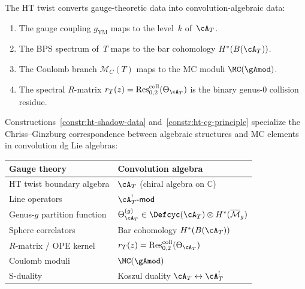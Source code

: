 \begin{construction}
\label{constr:ht-cg-principle}
The HT twist converts gauge-theoretic data into convolution-algebraic
data:
\begin{enumerate}[label=\textup{(\roman*)}]
\item The gauge coupling $g_{\mathrm{YM}}$ maps to the level~$k$
 of~$\cA_T$.
\item The BPS spectrum of~$T$ maps to the bar cohomology
 $H^*(B(\cA_T))$.
\item The Coulomb branch $\mathcal{M}_C(T)$ maps to the MC moduli
 $\MC(\gAmod)$.
\item The spectral $R$-matrix
 $r_T(z) = \operatorname{Res}^{\mathrm{coll}}_{0,2}(\Theta_{\cA_T})$
 is the binary genus-$0$ collision residue.
\end{enumerate}
\end{construction}

\begin{remark}[Dictionary]
\label{rem:ht-cg-dictionary}
Constructions~\ref{constr:ht-shadow-data} and~\ref{constr:ht-cg-principle} specialize the Chriss--Ginzburg
correspondence between algebraic structures and MC elements in
convolution dg Lie algebras:
\begin{center}
\renewcommand{\arraystretch}{1.2}
\begin{tabular}{ll}
\toprule
\textbf{Gauge theory} & \textbf{Convolution algebra} \\
\midrule
HT twist boundary algebra & $\cA_T$ (chiral algebra on $\mathbb{C}$) \\
Line operators & $\cA_T^!\text{-}\mathsf{mod}$ \\
Genus-$g$ partition function &
$\Theta_{\cA_T}^{(g)} \in \Defcyc(\cA_T) \otimes
H^*(\overline{\mathcal{M}}_g)$ \\
Sphere correlators & Bar cohomology $H^*(B(\cA_T))$ \\
$R$-matrix / OPE kernel &
$r_T(z) = \operatorname{Res}^{\mathrm{coll}}_{0,2}(\Theta_{\cA_T})$ \\
Coulomb moduli & $\MC(\gAmod)$ \\
S-duality & Koszul duality $\cA_T \leftrightarrow \cA_T^!$ \\
\bottomrule
\end{tabular}
\end{center}
\end{remark}

